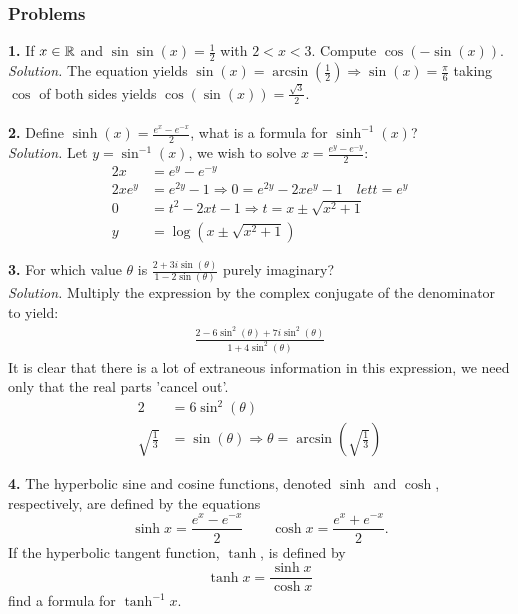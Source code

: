 \subsubsection{Problems}
\textbf{1.} If $x \in \mathbb{R}$ and $\sin\sin(x) = \frac{1}{2}$ with $2 < x < 3$. Compute $\cos(-\sin(x))$.\\

\textit{Solution.} The equation yields $\sin(x) = \arcsin\left(\frac{1}{2}\right) \Rightarrow \sin(x) = \frac{\pi}{6}$ taking $\cos$ of both sides 
yields $\cos(\sin(x)) = \frac{\sqrt{3}}{2}$.\\\\

\textbf{2.} Define $\sinh(x) = \frac{e^{x}-e^{-x}}{2}$, what is a formula for $\sinh^{-1}(x)$?\\

\textit{Solution.} Let $y = \sin^{-1}(x)$, we wish to solve $x = \frac{e^{y}-e^{-y}}{2}$:
\begin{align*}
	2x &= e^{y}-e^{-y}\\
	2xe^{y} &= e^{2y} - 1 \Rightarrow 0 = e^{2y} - 2xe^{y} - 1 \quad let t = e^{y}\\
	0 &= t^2 - 2xt - 1 \Rightarrow t = x \pm \sqrt{x^2 + 1}\\
	y &= \log(x \pm \sqrt{x^2 + 1})
\end{align*}

\textbf{3.} For which value $\theta$ is $\frac{2+3i\sin(\theta)}{1-2\sin(\theta)}$ purely imaginary?\\

\textit{Solution.} Multiply the expression by the complex conjugate of the denominator to yield:
\begin{align*}
	\frac{2 - 6\sin^{2}(\theta)+7i\sin^{2}(\theta)}{1 + 4\sin^{2}(\theta)}
\end{align*}
It is clear that there is a lot of extraneous information in this expression, we need only that the real parts 'cancel out'.
\begin{align*}
	2 &= 6\sin^{2}(\theta)\\
	\sqrt{\frac{1}{3}} &= \sin(\theta) \Rightarrow \theta = \arcsin\left(\sqrt{\frac{1}{3}}\right)
\end{align*}

\textbf{4.} The hyperbolic sine and cosine functions, denoted $\sinh$ and $\cosh$, respectively, are defined by the equations $$\sinh x = \frac{e^x - e^{-x}}{2} \qquad \cosh x = \frac{e^x + e^{-x}}{2}.$$ If the hyperbolic tangent function, $\tanh$, is defined by $$\tanh x = \frac{\sinh x}{\cosh x}$$ find a formula for $\tanh^{-1}x$. \\

